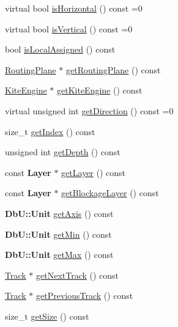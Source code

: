 \begin{DoxyCompactItemize}
\item 
virtual bool \hyperlink{classKite_1_1Track_a9d3db1f8a5aca58f8f54d291faebf873}{is\+Horizontal} () const =0
\item 
virtual bool \hyperlink{classKite_1_1Track_a6fa2bf0568a2b295dd7cd1f7207247d5}{is\+Vertical} () const =0
\item 
bool \hyperlink{classKite_1_1Track_a6835a410623b90e8abec4c7a4e0905b3}{is\+Local\+Assigned} () const
\item 
\hyperlink{classKite_1_1RoutingPlane}{Routing\+Plane} $\ast$ \hyperlink{classKite_1_1Track_a056650e788f5235d0c4cc49e870f29b4}{get\+Routing\+Plane} () const
\item 
\hyperlink{classKite_1_1KiteEngine}{Kite\+Engine} $\ast$ \hyperlink{classKite_1_1Track_af7373bd3a4ee8fcf28a316230ed37fc0}{get\+Kite\+Engine} () const
\item 
virtual unsigned int \hyperlink{classKite_1_1Track_ae35b78590ed6aa546b626ef95f28c533}{get\+Direction} () const =0
\item 
size\+\_\+t \hyperlink{classKite_1_1Track_ac6f0fd2129f44fe6c0c6eaca9766e1a3}{get\+Index} () const
\item 
unsigned int \hyperlink{classKite_1_1Track_a6c4d9081746b8daa3e45e5e3dd185b60}{get\+Depth} () const
\item 
const \textbf{ Layer} $\ast$ \hyperlink{classKite_1_1Track_ab468d5fc5ad722f437b81decc8209ab7}{get\+Layer} () const
\item 
const \textbf{ Layer} $\ast$ \hyperlink{classKite_1_1Track_aa719edbfb0c3d2f294cf658f1c6bfb37}{get\+Blockage\+Layer} () const
\item 
\textbf{ Db\+U\+::\+Unit} \hyperlink{classKite_1_1Track_ab5b5aaa5b318369feee6003dbad039c2}{get\+Axis} () const
\item 
\textbf{ Db\+U\+::\+Unit} \hyperlink{classKite_1_1Track_a71f401dbc8d152b50522ee459ef63441}{get\+Min} () const
\item 
\textbf{ Db\+U\+::\+Unit} \hyperlink{classKite_1_1Track_a7fdc462696aede86c051edfaa6268e9a}{get\+Max} () const
\item 
\hyperlink{classKite_1_1Track}{Track} $\ast$ \hyperlink{classKite_1_1Track_a1b8af68504f2de84cb85cf25e30f93bd}{get\+Next\+Track} () const
\item 
\hyperlink{classKite_1_1Track}{Track} $\ast$ \hyperlink{classKite_1_1Track_a984171d836a7f61df95e74beeddcf6b5}{get\+Previous\+Track} () const
\item 
size\+\_\+t \hyperlink{classKite_1_1Track_a9be1e4285daa77fe397767c097fbdc66}{get\+Size} () const

\end{DoxyCompactItemize}
